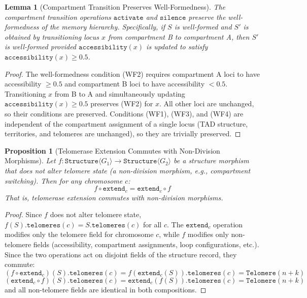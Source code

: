 \documentclass[12pt,a4paper]{article}
\theoremstyle{plain}
\newtheorem{proposition}[theorem]{Proposition}
\newtheorem{lemma}[theorem]{Lemma}
\theoremstyle{definition}
\begin{document}
\begin{lemma}[Compartment Transition Preserves Well-Formedness]\label{lem:compartment}
The compartment transition operations $\texttt{activate}$ and $\texttt{silence}$ preserve the well-formedness of the memory hierarchy. Specifically, if $S$ is well-formed and $S'$ is obtained by transitioning locus $x$ from compartment B to compartment A, then $S'$ is well-formed provided $\texttt{accessibility}(x)$ is updated to satisfy $\texttt{accessibility}(x) \geq 0.5$.
\end{lemma}

\begin{proof}
The well-formedness condition (WF2) requires compartment A loci to have accessibility $\geq 0.5$ and compartment B loci to have accessibility $< 0.5$. Transitioning $x$ from B to A and simultaneously updating $\texttt{accessibility}(x) \geq 0.5$ preserves (WF2) for $x$. All other loci are unchanged, so their conditions are preserved. Conditions (WF1), (WF3), and (WF4) are independent of the compartment assignment of a single locus (TAD structure, territories, and telomeres are unchanged), so they are trivially preserved.
\end{proof}

\begin{proposition}[Telomerase Extension Commutes with Non-Division Morphisms]\label{prop:telomerase-commute}
Let $f : \texttt{Structure}\langle G_1 \rangle \to \texttt{Structure}\langle G_2 \rangle$ be a structure morphism that does not alter telomere state (a non-division morphism, e.g., compartment switching). Then for any chromosome $c$:
\[
  f \circ \texttt{extend}_c = \texttt{extend}_c \circ f
\]
That is, telomerase extension commutes with non-division morphisms.
\end{proposition}

\begin{proof}
Since $f$ does not alter telomere state, $f(S).\texttt{telomeres}(c) = S.\texttt{telomeres}(c)$ for all $c$. The $\texttt{extend}_c$ operation modifies only the telomere field for chromosome $c$, while $f$ modifies only non-telomere fields (accessibility, compartment assignments, loop configurations, etc.). Since the two operations act on disjoint fields of the structure record, they commute:
\[
  (f \circ \texttt{extend}_c)(S).\texttt{telomeres}(c) = f(\texttt{extend}_c(S)).\texttt{telomeres}(c) = \texttt{Telomere}(n + k)
\]
\[
  (\texttt{extend}_c \circ f)(S).\texttt{telomeres}(c) = \texttt{extend}_c(f(S)).\texttt{telomeres}(c) = \texttt{Telomere}(n + k)
\]
and all non-telomere fields are identical in both compositions.
\end{proof}
\end{document}
